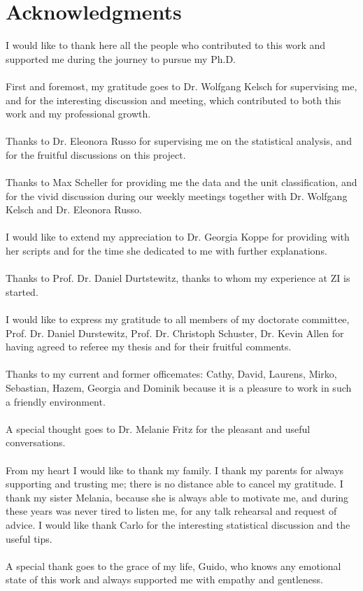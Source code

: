 \chapter*{Acknowledgments}
\label{Acknowledgments}
\markboth{}{}
I would like to thank here all the people who contributed to this work and supported me during the journey to pursue my Ph.D.\\\\
First and foremost, my gratitude goes to Dr. Wolfgang Kelsch for supervising me, and for the interesting discussion and meeting, which contributed to both this work and my professional growth.\\\\
Thanks to Dr. Eleonora Russo for supervising me on the statistical analysis, and for the fruitful discussions on this project.\\\\
Thanks to Max Scheller for providing me the data and the unit classification, and for the vivid discussion during our weekly meetings together with Dr. Wolfgang Kelsch and Dr. Eleonora Russo.\\\\
I would like to extend my appreciation to Dr. Georgia Koppe for providing with her scripts and for the time she dedicated to me with further explanations.\\\\
Thanks to Prof. Dr. Daniel Durtstewitz, thanks to whom my experience at ZI is started.\\\\
I would like to express my gratitude to all members of my doctorate committee, Prof. Dr. Daniel Durstewitz, Prof. Dr. Christoph Schuster, Dr. Kevin Allen for having agreed to referee my thesis and for their fruitful comments.\\\\
Thanks to my current and former officemates: Cathy, David, Laurens, Mirko, Sebastian, Hazem, Georgia and Dominik because it is a pleasure to work in such a friendly environment.\\\\
A special thought goes to Dr. Melanie Fritz for the pleasant and useful conversations.\\\\
From my heart I would like to thank my family. I thank my parents for always supporting and trusting me; there is no distance able to cancel my gratitude. I thank my sister Melania, because she is always able to motivate me, and during these years was never tired to listen me, for any talk rehearsal and request of advice. I would like thank Carlo for the interesting statistical discussion and the useful tips.\\\\
A special thank goes to the grace of my life, Guido, who knows any emotional state of this work and always supported me with empathy and gentleness.
